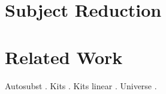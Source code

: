 \documentclass[sigplan,10pt]{acmart}
\newcommand*\AppCode[1]{{#1}}
\begin{document}
  \section{Subject Reduction}
  \AppCode\FSubjectReduction
  \AppCode\FSubjectReductionProofInteresting

  \section{Related Work}
  Autosubst \cite{DBLP:conf/cpp/StarkSK19, DBLP:conf/itp/SchaferTS15}.
  Kits \cite{DBLP:journals/jar/BentonHKM12, unpublished:mcbride2005kits}.
  Kits linear \cite{DBLP:journals/corr/abs-2005-02247}.
  Universe \cite{DBLP:journals/pacmpl/AllaisA0MM18}.

  

  \clearpage
  \appendix
\end{document}
